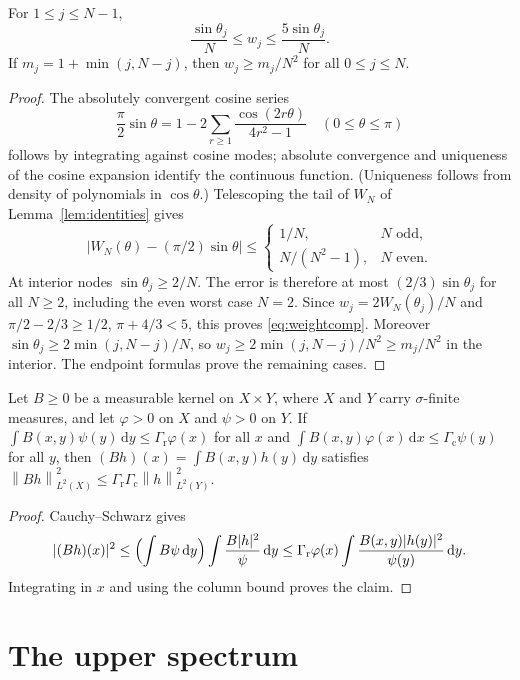 \documentclass{siamart251216}
\newcommand{\norm}[1]{\left\lVert#1\right\rVert}
\newcommand{\dd}{\,\mathrm d}
\begin{document}
\begin{lemma}\label{lem:weight-comparison}
For $1\le j\le N-1$,
\begin{equation}\label{eq:weightcomp}
 \frac{\sin\theta_j}{N}\le w_j\le\frac{5\sin\theta_j}{N}.
\end{equation}
If $m_j=1+\min(j,N-j)$, then $w_j\ge m_j/N^2$ for all $0\le j\le N$.
\end{lemma}
\begin{proof}
The absolutely convergent cosine series
\[
 \frac\pi2\sin\theta=1-2\sum_{r\ge1}
                  \frac{\cos(2r\theta)}{4r^2-1}\quad(0\le\theta\le\pi)
\]
follows by integrating against cosine modes; absolute convergence and
uniqueness of the cosine expansion identify the continuous function.
(Uniqueness follows from density of polynomials in $\cos\theta$.)
Telescoping the tail of $W_N$ of Lemma~\ref{lem:identities} gives
\[
 |W_N(\theta)-(\pi/2)\sin\theta|
 \le\begin{cases}1/N,&N\text{ odd},\\N/(N^2-1),&N\text{ even}.
 \end{cases}
\]
At interior nodes $\sin\theta_j\ge2/N$. The error is therefore at most
$(2/3)\sin\theta_j$ for all $N\ge2$, including the even worst case $N=2$.
Since $w_j=2W_N(\theta_j)/N$ and
$\pi/2-2/3\ge1/2$, $\pi+4/3<5$, this proves
\eqref{eq:weightcomp}. Moreover
$\sin\theta_j\ge2\min(j,N-j)/N$, so
$w_j\ge2\min(j,N-j)/N^2\ge m_j/N^2$ in the interior.
The endpoint formulas prove the remaining cases.
\end{proof}

\begin{lemma}\label{lem:schur}
Let $B\ge0$ be a measurable kernel on $X\times Y$, where $X$ and $Y$ carry
$\sigma$-finite measures, and let $\varphi>0$ on $X$ and $\psi>0$ on $Y$.
If $\int B(x,y)\psi(y)\dd y\le\Gamma_{\mathrm r}\varphi(x)$ for all $x$ and
$\int B(x,y)\varphi(x)\dd x\le\Gamma_{\mathrm c}\psi(y)$ for all $y$, then
$(Bh)(x)=\int B(x,y)h(y)\dd y$ satisfies
$\norm{Bh}_{L^2(X)}^2\le\Gamma_{\mathrm r}\Gamma_{\mathrm c}\norm h_{L^2(Y)}^2$.
\end{lemma}
\begin{proof}
Cauchy--Schwarz gives
\[
 |(Bh)(x)|^2\le\Bigl(\int B\psi\dd y\Bigr)\int\frac{B|h|^2}{\psi}\dd y
 \le\Gamma_{\mathrm r}\varphi(x)\int\frac{B(x,y)|h(y)|^2}{\psi(y)}\dd y .
\]
Integrating in $x$ and using the column bound proves the claim.
\end{proof}

\section{The upper spectrum}\label{sec:upper}
\end{document}
